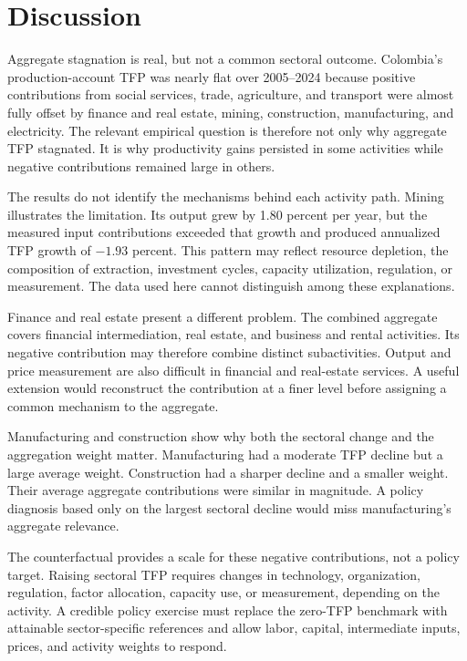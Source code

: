 \section{Discussion}

Aggregate stagnation is real, but not a common sectoral outcome. Colombia's production-account TFP was nearly flat over 2005--2024 because positive contributions from social services, trade, agriculture, and transport were almost fully offset by finance and real estate, mining, construction, manufacturing, and electricity. The relevant empirical question is therefore not only why aggregate TFP stagnated. It is why productivity gains persisted in some activities while negative contributions remained large in others.

The results do not identify the mechanisms behind each activity path. Mining illustrates the limitation. Its output grew by 1.80 percent per year, but the measured input contributions exceeded that growth and produced annualized TFP growth of $-1.93$ percent. This pattern may reflect resource depletion, the composition of extraction, investment cycles, capacity utilization, regulation, or measurement. The data used here cannot distinguish among these explanations.

Finance and real estate present a different problem. The combined aggregate covers financial intermediation, real estate, and business and rental activities. Its negative contribution may therefore combine distinct subactivities. Output and price measurement are also difficult in financial and real-estate services. A useful extension would reconstruct the contribution at a finer level before assigning a common mechanism to the aggregate.

Manufacturing and construction show why both the sectoral change and the aggregation weight matter. Manufacturing had a moderate TFP decline but a large average weight. Construction had a sharper decline and a smaller weight. Their average aggregate contributions were similar in magnitude. A policy diagnosis based only on the largest sectoral decline would miss manufacturing's aggregate relevance.

The counterfactual provides a scale for these negative contributions, not a policy target. Raising sectoral TFP requires changes in technology, organization, regulation, factor allocation, capacity use, or measurement, depending on the activity. A credible policy exercise must replace the zero-TFP benchmark with attainable sector-specific references and allow labor, capital, intermediate inputs, prices, and activity weights to respond.

